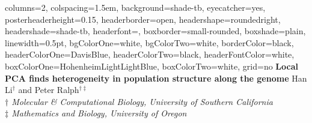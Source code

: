 \documentclass[fontscale=0.38,a0paper]{baposter}
\begin{document}
\newlength{\leftimgwidth}
\begin{poster}%
  {
  columns=2,
  colspacing=1.5em,
  background=shade-tb,
  eyecatcher=yes,
  posterheaderheight=0.15\textheight,
  headerborder=open,
  headershape=roundedright,
  headershade=shade-tb,
  headerfont=\Large\textsf, %
  boxborder=small-rounded,
  boxshade=plain,
  linewidth=0.5pt,
  bgColorOne=white,
  bgColorTwo=white,
  borderColor=black,
  headerColorOne=DavisBlue,
  headerColorTwo=black,
  headerFontColor=white,
  boxColorOne=HohenheimLightLightBlue,
  boxColorTwo=white,
  grid=no
  }
  {
  }
  {\sf %
  \vspace{0.5em}
     \textbf{\textcolor{DavisBlue}{Local PCA finds heterogeneity in population structure along the genome}}\vspace{0.5em}}
  {\sf %
    Han Li$^{\dagger}$ and Peter Ralph$^{\dagger\ddagger}$ \\  \vspace{-1.0mm}
    {\small \textit{$\dagger$ Molecular \& Computational Biology, University of Southern California }}\\  
    {\small \textit{$\ddagger$ Mathematics and Biology, University of Oregon} }\\
}
\end{poster}
\end{document}
